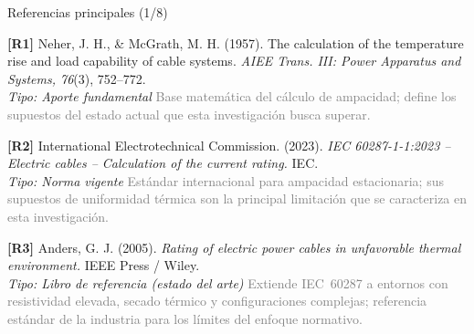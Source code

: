 \documentclass[aspectratio=169]{beamer}
\begin{document}
\begin{frame}{Referencias principales (1/8)}
\small\justifying

\textbf{[R1]} Neher, J. H., \& McGrath, M. H. (1957). The calculation of the
temperature rise and load capability of cable systems. \textit{AIEE Trans.
III: Power Apparatus and Systems, 76}(3), 752--772.\\
\textcolor{blue!60!black}{\footnotesize\textit{Tipo: Aporte fundamental}} \quad
\textcolor{gray}{\footnotesize Base matemática del cálculo de ampacidad; define
los supuestos del estado actual que esta investigación busca superar.}

\medskip
\textbf{[R2]} International Electrotechnical Commission. (2023). \textit{IEC
60287-1-1:2023 -- Electric cables -- Calculation of the current rating.} IEC.\\
\textcolor{blue!60!black}{\footnotesize\textit{Tipo: Norma vigente}} \quad
\textcolor{gray}{\footnotesize Estándar internacional para ampacidad estacionaria;
sus supuestos de uniformidad térmica son la principal limitación que se
caracteriza en esta investigación.}

\medskip
\textbf{[R3]} Anders, G. J. (2005). \textit{Rating of electric power cables in
unfavorable thermal environment.} IEEE Press / Wiley.\\
\textcolor{blue!60!black}{\footnotesize\textit{Tipo: Libro de referencia (estado del arte)}} \quad
\textcolor{gray}{\footnotesize Extiende IEC~60287 a entornos con resistividad
elevada, secado térmico y configuraciones complejas; referencia estándar de la
industria para los límites del enfoque normativo.}
\end{frame}
\end{document}
